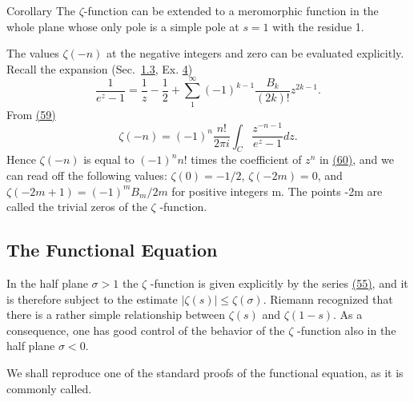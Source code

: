 \begin{originalstatement}{Corollary}{}\label{cor:5.unnumbered-p231-b6}
The $\zeta$-function can be extended to a meromorphic function in the whole plane whose only pole is a simple pole at $s = 1$ with the residue 1.
\end{originalstatement}
The values $\zeta(-n)$ at the negative integers and zero can be evaluated explicitly. Recall the expansion (Sec.~\hyperref[sec:5.1.3]{1.3}, Ex. \hyperref[exercise:5.1.3.3.4]{4})
\begin{equation*}
\frac {1}{e ^ {z} - 1} = \frac {1}{z} - \frac {1}{2} + \sum_ {1} ^ {\infty} (- 1) ^ {k - 1} \frac {B _ {k}}{(2 k) !} z ^ {2 k - 1}.\tag{60}\label{eq:5.60}
\end{equation*}
From \hyperref[eq:5.59]{(59)}
\begin{equation*}
\zeta (- n) = (- 1) ^ {n} \frac {n !}{2 \pi i} \int_ {C} \frac {z ^ {- n - 1}}{e ^ {z} - 1} d z.
\end{equation*}
Hence $\zeta(-n)$ is equal to $(-1)^{n} n!$ times the coefficient of $z^{n}$ in \hyperref[eq:5.60]{(60)}, and
we can read off the following values: $\zeta(0) = -1/2$, $\zeta(-2m) = 0$, and $\zeta(-2m + 1) = (-1)^{m}B_{m}/2m$ for positive integers m. The points -2m are called the trivial zeros of the $\zeta$ -function.

\setcounter{section}{4}\setcounter{subsection}{2}\subsection{The Functional Equation}\label{sec:5.4.3}
In the half plane $\sigma > 1$ the $\zeta$ -function is given explicitly by the series \hyperref[eq:5.55]{(55)}, and it is therefore subject to the estimate $|\zeta(s)| \leq \zeta(\sigma)$. Riemann recognized that there is a rather simple relationship between $\zeta(s)$ and $\zeta(1 - s)$. As a consequence, one has good control of the behavior of the $\zeta$ -function also in the half plane $\sigma < 0$.

We shall reproduce one of the standard proofs of the functional equation, as it is commonly called.

